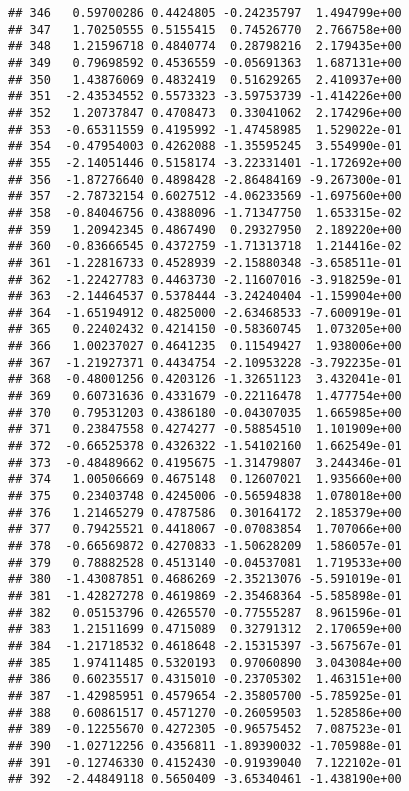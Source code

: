 \documentclass[
]{article}
\begin{document}
\begin{verbatim}
## 346   0.59700286 0.4424805 -0.24235797  1.494799e+00
## 347   1.70250555 0.5155415  0.74526770  2.766758e+00
## 348   1.21596718 0.4840774  0.28798216  2.179435e+00
## 349   0.79698592 0.4536559 -0.05691363  1.687131e+00
## 350   1.43876069 0.4832419  0.51629265  2.410937e+00
## 351  -2.43534552 0.5573323 -3.59753739 -1.414226e+00
## 352   1.20737847 0.4708473  0.33041062  2.174296e+00
## 353  -0.65311559 0.4195992 -1.47458985  1.529022e-01
## 354  -0.47954003 0.4262088 -1.35595245  3.554990e-01
## 355  -2.14051446 0.5158174 -3.22331401 -1.172692e+00
## 356  -1.87276640 0.4898428 -2.86484169 -9.267300e-01
## 357  -2.78732154 0.6027512 -4.06233569 -1.697560e+00
## 358  -0.84046756 0.4388096 -1.71347750  1.653315e-02
## 359   1.20942345 0.4867490  0.29327950  2.189220e+00
## 360  -0.83666545 0.4372759 -1.71313718  1.214416e-02
## 361  -1.22816733 0.4528939 -2.15880348 -3.658511e-01
## 362  -1.22427783 0.4463730 -2.11607016 -3.918259e-01
## 363  -2.14464537 0.5378444 -3.24240404 -1.159904e+00
## 364  -1.65194912 0.4825000 -2.63468533 -7.600919e-01
## 365   0.22402432 0.4214150 -0.58360745  1.073205e+00
## 366   1.00237027 0.4641235  0.11549427  1.938006e+00
## 367  -1.21927371 0.4434754 -2.10953228 -3.792235e-01
## 368  -0.48001256 0.4203126 -1.32651123  3.432041e-01
## 369   0.60731636 0.4331679 -0.22116478  1.477754e+00
## 370   0.79531203 0.4386180 -0.04307035  1.665985e+00
## 371   0.23847558 0.4274277 -0.58854510  1.101909e+00
## 372  -0.66525378 0.4326322 -1.54102160  1.662549e-01
## 373  -0.48489662 0.4195675 -1.31479807  3.244346e-01
## 374   1.00506669 0.4675148  0.12607021  1.935660e+00
## 375   0.23403748 0.4245006 -0.56594838  1.078018e+00
## 376   1.21465279 0.4787586  0.30164172  2.185379e+00
## 377   0.79425521 0.4418067 -0.07083854  1.707066e+00
## 378  -0.66569872 0.4270833 -1.50628209  1.586057e-01
## 379   0.78882528 0.4513140 -0.04537081  1.719533e+00
## 380  -1.43087851 0.4686269 -2.35213076 -5.591019e-01
## 381  -1.42827278 0.4619869 -2.35468364 -5.585898e-01
## 382   0.05153796 0.4265570 -0.77555287  8.961596e-01
## 383   1.21511699 0.4715089  0.32791312  2.170659e+00
## 384  -1.21718532 0.4618648 -2.15315397 -3.567567e-01
## 385   1.97411485 0.5320193  0.97060890  3.043084e+00
## 386   0.60235517 0.4315010 -0.23705302  1.463151e+00
## 387  -1.42985951 0.4579654 -2.35805700 -5.785925e-01
## 388   0.60861517 0.4571270 -0.26059503  1.528586e+00
## 389  -0.12255670 0.4272305 -0.96575452  7.087523e-01
## 390  -1.02712256 0.4356811 -1.89390032 -1.705988e-01
## 391  -0.12746330 0.4152430 -0.91939040  7.122102e-01
## 392  -2.44849118 0.5650409 -3.65340461 -1.438190e+00

\end{verbatim}
\end{document}
